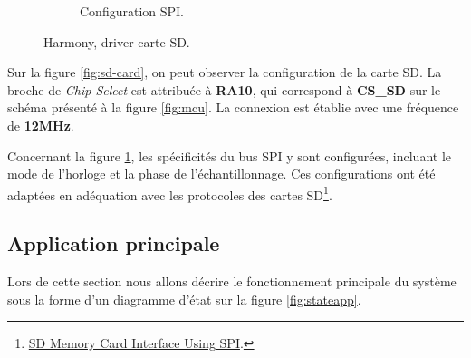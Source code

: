 \begin{figure}[!h]
\begin{subfigure}[b]{0.44\textwidth}
		\caption{Configuration SPI.}
		\label{fig:sd-card-spi}
	\end{subfigure}
	\hfill
	\caption{Harmony, driver carte-SD.}
	\label{fig:HDriverSD}
\end{figure}

Sur la figure \ref{fig:sd-card}, on peut observer la configuration de la carte SD. La broche de \textit{Chip Select} est attribuée à \textbf{RA10}, qui correspond à \textbf{CS\_SD} sur le schéma présenté à la figure \ref{fig:mcu}. La connexion est établie avec une fréquence de \textbf{12MHz}.

Concernant la figure \ref{fig:sd-card-spi}, les spécificités du bus SPI y sont configurées, incluant le mode de l'horloge et la phase de l'échantillonnage. Ces configurations ont été adaptées en adéquation avec les protocoles des cartes SD\footnote{\href{https://www.renesas.com/us/en/document/apn/sd-memory-card-interface-using-spi}{SD Memory Card Interface Using SPI}.}.


\clearpage

\subsection{Application principale} 

Lors de cette section nous allons décrire le fonctionnement principale du système sous la forme d'un diagramme d'état sur la figure \ref{fig:stateapp}.

